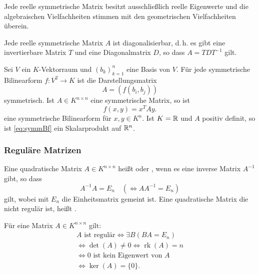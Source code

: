 Jede reelle symmetrische Matrix besitzt ausschließlich reelle
Eigenwerte und die algebraischen Vielfachheiten stimmen mit den
geometrischen Vielfachheiten überein.

Jede reelle symmetrische Matrix $A$ ist diagonalisierbar, d.\,h. es gibt
eine invertierbare Matrix $T$ und eine Diagonalmatrix $D$, so dass
$A=TDT^{-1}$ gilt.

Sei $V$ ein $K$-Vektorraum und $(b_k)_{k=1}^n$ eine Basis von $V$.
Für jede symmetrische Bilinearform
$f\colon V^2\to K$ ist die
Darstellungsmatrix
\begin{equation}
A = (f(b_i,b_j))
\end{equation}
symmetrisch. Ist $A\in K^{n\times n}$ eine symmetrische Matrix, so
ist
\begin{equation}\label{eq:symmBf}
f(x,y) = x^T A y.
\end{equation}
eine symmetrische Bilinearform für  $x,y\in K^n$.
Ist $K=\mathbb R$ und $A$ positiv definit, so ist
\eqref{eq:symmBf} ein Skalarprodukt auf $\mathbb R^n$.

\subsubsection{Reguläre Matrizen}
\begin{definition}\mbox{}\newline
Eine quadratische Matrix $A\in K^{n\times n}$ heißt
oder , wenn es eine inverse Matrix $A^{-1}$ gibt,
so dass
\begin{equation}
A^{-1}A = E_n \quad (\iff AA^{-1} = E_n)
\end{equation}
gilt, wobei mit $E_n$ die Einheitsmatrix gemeint ist.
Eine quadratische Matrix die nicht regulär ist, heißt
.
\end{definition}

 Für eine Matrix $A\in K^{n\times n}$ gilt:
\begin{gather}
A\text{ ist regulär}\iff \exists B (BA=E_n)\\
\iff \det(A)\ne 0 \iff \operatorname{rk}(A)=n\\
\iff 0\text{ ist kein Eigenwert von }A\\
\iff \ker(A)=\{0\}.
\end{gather}

